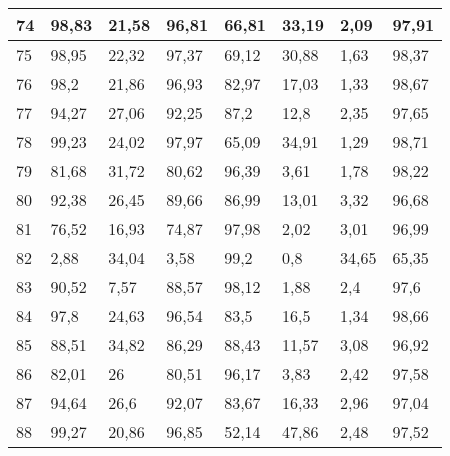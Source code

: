 \begin{longtable}[c]{|l|l|l|l|l|l|l|l|}
74              & 98,83        & 21,58        & 96,81       & 66,81         & 33,19         & 2,09          & 97,91         \\ \hline
75              & 98,95        & 22,32        & 97,37       & 69,12         & 30,88         & 1,63          & 98,37         \\ \hline
76              & 98,2         & 21,86        & 96,93       & 82,97         & 17,03         & 1,33          & 98,67         \\ \hline
77              & 94,27        & 27,06        & 92,25       & 87,2          & 12,8          & 2,35          & 97,65         \\ \hline
78              & 99,23        & 24,02        & 97,97       & 65,09         & 34,91         & 1,29          & 98,71         \\ \hline
79              & 81,68        & 31,72        & 80,62       & 96,39         & 3,61          & 1,78          & 98,22         \\ \hline
80              & 92,38        & 26,45        & 89,66       & 86,99         & 13,01         & 3,32          & 96,68         \\ \hline
81              & 76,52        & 16,93        & 74,87       & 97,98         & 2,02          & 3,01          & 96,99         \\ \hline
82              & 2,88         & 34,04        & 3,58        & 99,2          & 0,8           & 34,65         & 65,35         \\ \hline
83              & 90,52        & 7,57         & 88,57       & 98,12         & 1,88          & 2,4           & 97,6          \\ \hline
84              & 97,8         & 24,63        & 96,54       & 83,5          & 16,5          & 1,34          & 98,66         \\ \hline
85              & 88,51        & 34,82        & 86,29       & 88,43         & 11,57         & 3,08          & 96,92         \\ \hline
86              & 82,01        & 26           & 80,51       & 96,17         & 3,83          & 2,42          & 97,58         \\ \hline
87              & 94,64        & 26,6         & 92,07       & 83,67         & 16,33         & 2,96          & 97,04         \\ \hline
88              & 99,27        & 20,86        & 96,85       & 52,14         & 47,86         & 2,48          & 97,52         \\ \hline

\end{longtable}
